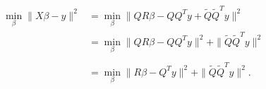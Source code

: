 \documentclass[convert={density=300,outext=.png}]{standalone}
\begin{document}
\begin{minipage}[t]{0.3\textwidth}
\begin{align*}
\min_\beta\|X\beta - y\|^2 &= \min_\beta\|QR\beta- QQ^Ty + \tilde{Q}\tilde{Q}^Ty\|^2\\
&= \min_\beta\|QR\beta- QQ^Ty\|^2 + \|\tilde{Q}\tilde{Q}^Ty\|^2\\
&\\
&= \min_\beta\|R\beta- Q^Ty\|^2 + \|\tilde{Q}\tilde{Q}^Ty\|^2.
\end{align*}
\end{minipage}
\end{document}
